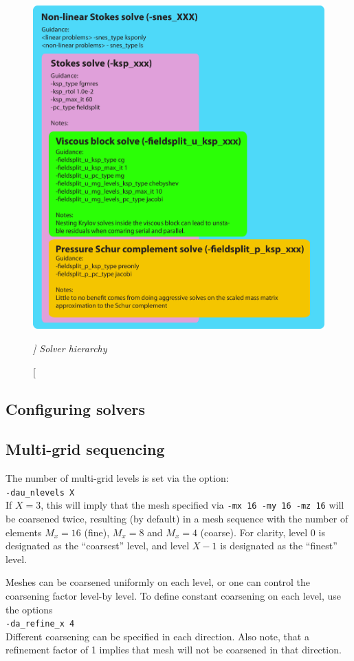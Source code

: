 \documentclass[paper=a4, fontsize=11pt,twoside]{scrartcl}
\newcommand{\shellcmd}[1]{\\\indent\indent\texttt{\hspace{5mm}\footnotesize #1}\\}
\newcommand{\unix}[1]{\texttt{\footnotesize #1}}
\begin{document}
{{\begin{figure} [hbtp]
\center
\includegraphics[height=0.6\textheight]{figs/pt3d_solve_hierarchy.pdf}
\caption[\itshape ]
{\itshape Solver hierarchy}
\label{fig:solver_hierarchy}
\end{figure}


\subsection{Configuring solvers}

\subsection{Multi-grid sequencing}
The number of multi-grid levels is set via the option:
\shellcmd{-dau\_nlevels X}
If $X = 3$, this will imply that the mesh specified via \unix{-mx 16 -my 16 -mz 16} will be coarsened twice, resulting (by default) in a mesh sequence with the number of elements $M_x = 16$ (fine), $M_x = 8$ and $M_x = 4$ (coarse). For clarity, level 0 is designated as the ``coarsest'' level, and level $X-1$ is designated as the ``finest'' level.

Meshes can be coarsened uniformly on each level, or one can control the coarsening factor level-by level.
To define constant coarsening on each level, use the options
\shellcmd{-da\_refine\_x 4}
Different coarsening can be specified in each direction.
Also note, that a refinement factor of 1 implies that mesh will not be coarsened in that direction. 

}}
\end{document}
